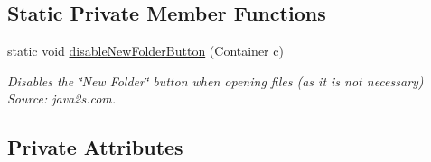 \subsection*{Static Private Member Functions}
\begin{DoxyCompactItemize}
\item 
static void \hyperlink{classcom_1_1lclion_1_1midigui_1_1_j_frame_m_i_d_i_piano_sheet_creator_af20c88021968d70d8665d3664e95a849}{disable\+New\+Folder\+Button} (Container c)
\begin{DoxyCompactList}\small\item\em Disables the \char`\"{}\+New Folder\char`\"{} button when opening files (as it is not necessary) Source\+: java2s.\+com. \end{DoxyCompactList}\end{DoxyCompactItemize}
\subsection*{Private Attributes}
